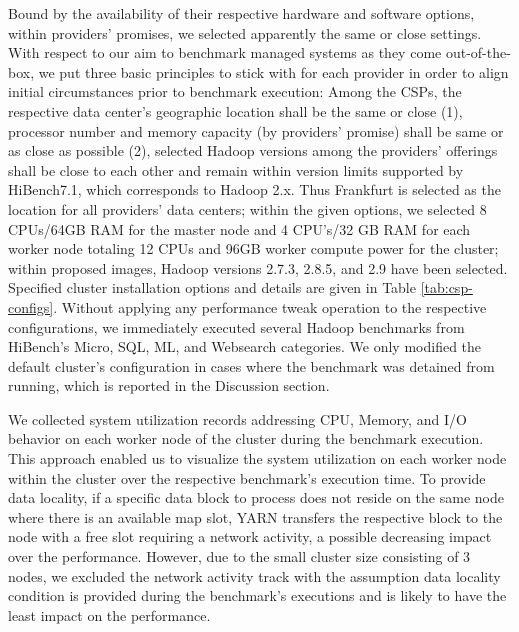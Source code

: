 \documentclass[review]{elsarticle}
\begin{document}
Bound by the availability of their respective hardware and software options, within providers' promises, we selected apparently the same or close settings. With respect to our aim to benchmark managed systems as they come out-of-the-box, we put three basic principles to stick with for each provider in order to align initial circumstances prior to benchmark execution: Among the CSPs, the respective data center's geographic location shall be the same or close (1), processor number and memory capacity (by providers' promise) shall be same or as close as possible (2), selected Hadoop versions among the providers' offerings shall be close to each other and remain within version limits supported by HiBench7.1, which corresponds to Hadoop 2.x. Thus Frankfurt is selected as the location for all providers' data centers; within the given options, we selected 8 CPUs/64GB RAM for the master node and 4 CPU's/32 GB RAM for each worker node totaling 12 CPUs and 96GB worker compute power for the cluster; within proposed images, Hadoop versions 2.7.3, 2.8.5, and 2.9 have been selected. Specified cluster installation options and details are given in Table \ref{tab:csp-configs}. Without applying any performance tweak operation to the respective configurations, we immediately executed several Hadoop benchmarks from HiBench's Micro, SQL, ML, and Websearch categories. We only modified the default cluster's configuration in cases where the benchmark was detained from running, which is reported in the Discussion section.

We collected system utilization records addressing CPU, Memory, and I/O behavior on each worker node of the cluster during the benchmark execution. This approach enabled us to visualize the system utilization on each worker node within the cluster over the respective benchmark's execution time. To provide data locality, if a specific data block to process does not reside on the same node where there is an available map slot, YARN transfers the respective block to the node with a free slot requiring a network activity, a possible decreasing impact over the performance. However, due to the small cluster size consisting of 3 nodes, we excluded the network activity track with the assumption data locality condition is provided during the benchmark's executions and is likely to have the least impact on the performance.
\end{document}
